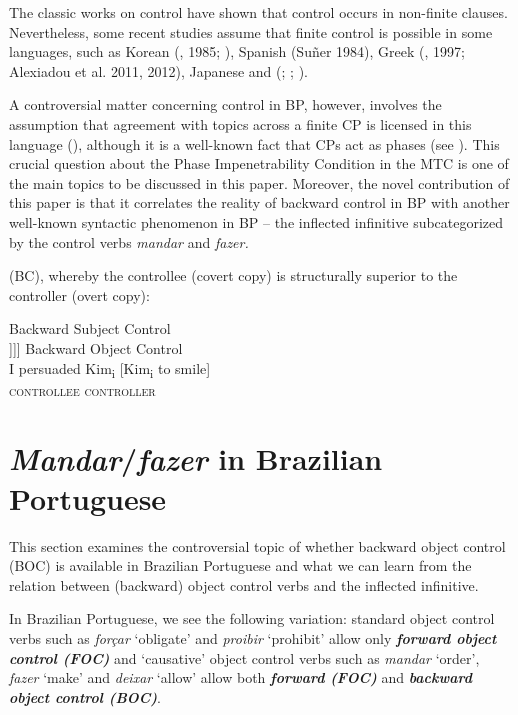 \documentclass[output=paper]{langsci/langscibook}
\begin{document}
The classic works on control have shown that control occurs in non-finite clauses. Nevertheless, some recent studies assume that finite control is possible in some languages, such as Korean (\citealt{Yang1982}, 1985; \citealt{Borer1989}), Spanish (Suñer 1984), Greek (\citealt{Terzi1992}, 1997; Alexiadou et al. 2011, 2012), Japanese \citep{Uchibori2000} and (\citealt{Farrell1995}; \citealt{Rodrigues2004}; \citealt{Boeckx2006}).

A controversial matter concerning control in BP, however, involves the assumption that agreement with topics across a finite CP is licensed in this language (\citealt{Martins2010}), although it is a well-known fact that CPs act as phases (see \citealt{Chomsky2000}). This crucial question about the Phase Impenetrability Condition in the MTC is one of the main topics to be discussed in this paper. Moreover, the novel contribution of this paper is that it correlates the reality of backward control in BP with another well-known syntactic phenomenon in BP – the inflected infinitive subcategorized by the control verbs \textit{mandar} and \textit{fazer.}

(BC), whereby the controllee (covert copy) is structurally superior to the controller (overt copy):

\ea%
\label{ex:moreno:3}
    \ea Backward Subject Control\\\relax
        [\textsubscript{TP} Bill [\textsubscript{vP} Bill tried [\textsubscript{IP} Bill to [\textsubscript{vP} Bill cut the line]]]]
    \ex Backward Object Control\\
        \gll I persuaded  Kim\textsubscript{i}    [Kim\textsubscript{i}    to smile]  \\
        {}  {}        \textsc{controllee}    \textsc{controller}\\
    \z
\z

\section{\textit{Mandar}/\textit{fazer} in Brazilian Portuguese}%

This section examines the controversial topic of whether backward object control (BOC) is available in Brazilian Portuguese and what we can learn from the relation between (backward) object control verbs and the inflected infinitive.

In Brazilian Portuguese, we see the following variation: standard object control verbs such as \textit{forçar} ‘obligate’ and \textit{proibir} ‘prohibit’ allow only \textbf{\textit{forw}}\textbf{\textit{ard object control (FOC)}}  and ‘causative’ object control verbs such as \textit{mandar} ‘order’, \textit{fazer} ‘make’ and \textit{deixar} ‘allow’ allow both \textbf{\textit{forward (FOC)}} and \textbf{\textit{backward object control (BOC)}}.  
\end{document}
